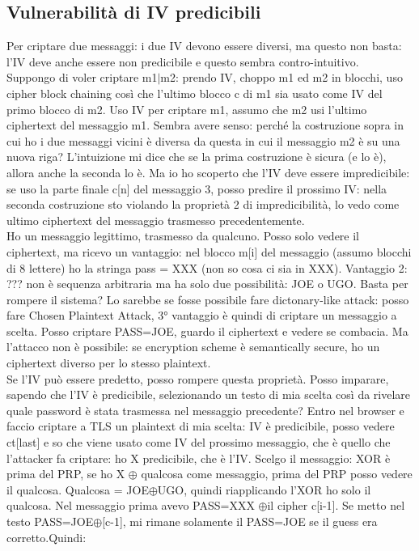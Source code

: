 \documentclass[16px]{article}
\begin{document}
\subsection{Vulnerabilità di IV predicibili}
Per criptare due messaggi: i due IV devono essere diversi, ma questo non basta: l'IV deve anche essere non predicibile e questo sembra contro-intuitivo.\\ Suppongo di voler criptare m1$|$m2: prendo IV, choppo m1 ed m2 in blocchi, uso cipher block chaining così che l'ultimo blocco c di m1 sia usato come IV del primo blocco di m2. Uso IV per criptare m1, assumo che m2 usi l'ultimo ciphertext del messaggio m1. Sembra avere senso: perché la costruzione sopra in cui ho i due messaggi vicini è diversa da questa in cui il messaggio m2 è su una nuova riga? L'intuizione mi dice che se la prima costruzione è sicura (e lo è), allora anche la seconda lo è. Ma io ho scoperto che l'IV deve essere impredicibile: se uso la parte finale c[n] del messaggio 3, posso predire il prossimo IV: nella seconda costruzione sto violando la proprietà 2 di impredicibilità, lo vedo come ultimo ciphertext del messaggio trasmesso precedentemente.\\
Ho un messaggio legittimo, trasmesso da qualcuno. Posso solo vedere il ciphertext, ma ricevo un vantaggio: nel blocco m[i] del messaggio (assumo blocchi di 8 lettere) ho la stringa pass = XXX (non so cosa ci sia in XXX). Vantaggio 2: ??? non è sequenza arbitraria ma ha solo due possibilità: JOE o UGO. Basta per rompere il sistema? Lo sarebbe se fosse possibile fare dictonary-like attack: posso fare Chosen Plaintext Attack, 3° vantaggio è quindi di criptare un messaggio a scelta. Posso criptare PASS=JOE, guardo il ciphertext e vedere se combacia. Ma l'attacco non è possibile: se encryption scheme è semantically secure, ho un ciphertext diverso per lo stesso plaintext.\\ Se l'IV può essere predetto, posso rompere questa proprietà. Posso imparare, sapendo che l'IV è predicibile, selezionando un testo di mia scelta così da rivelare quale password è stata trasmessa nel messaggio precedente? Entro nel browser e faccio criptare a TLS un plaintext di mia scelta: IV è predicibile, posso vedere ct[last] e so che viene usato come IV del prossimo messaggio, che è quello che l'attacker fa criptare: ho X predicibile, che è l'IV. Scelgo il messaggio: XOR è prima del PRP, se ho X $\oplus$ qualcosa come messaggio, prima del PRP posso vedere il qualcosa. Qualcosa = JOE$\oplus$UGO, quindi riapplicando l'XOR ho solo il qualcosa. Nel messaggio prima avevo PASS=XXX $\oplus$il cipher c[i-1]. Se metto nel testo PASS=JOE$\oplus$[c-1], mi rimane solamente il PASS=JOE se il guess era corretto.Quindi:
\end{document}
